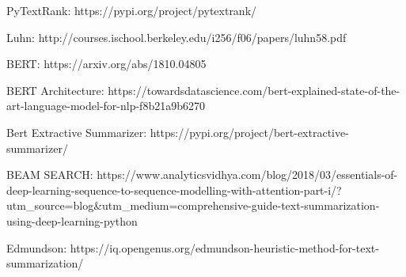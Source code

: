 \documentclass[fleqn,10pt]{SelfArx} %
\begin{document}
PyTextRank: https://pypi.org/project/pytextrank/

Luhn: http://courses.ischool.berkeley.edu/i256/f06/papers/luhn58.pdf

BERT: https://arxiv.org/abs/1810.04805

BERT Architecture: https://towardsdatascience.com/bert-explained-state-of-the-art-language-model-for-nlp-f8b21a9b6270

Bert Extractive Summarizer: https://pypi.org/project/bert-extractive-summarizer/

BEAM SEARCH: https://www.analyticsvidhya.com/blog/2018/03/essentials-of-deep-learning-sequence-to-sequence-modelling-with-attention-part-i/?utm_source=blog&utm_medium=comprehensive-guide-text-summarization-using-deep-learning-python 

Edmundson: https://iq.opengenus.org/edmundson-heuristic-method-for-text-summarization/
\end{document}

